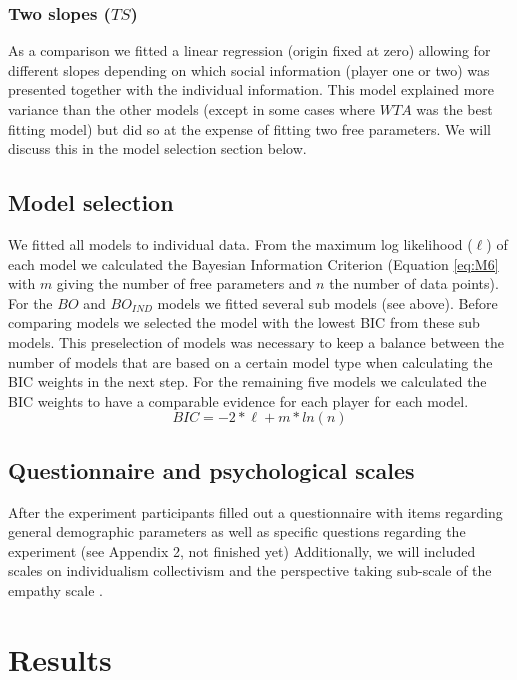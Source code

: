 \documentclass[jou]{apa}
\begin{document}
\subsubsection{Two slopes ($TS$)}
As a comparison we fitted a linear regression (origin fixed at zero) allowing for different slopes depending on which social information (player one or two) was presented together with the individual information. This model explained more variance than the other models (except in some cases where $WTA$ was the best fitting model) but did so at the expense of fitting two free parameters. We will discuss this in the model selection section below.
\subsection{Model selection}
We fitted all models to individual data. From the maximum log likelihood ($\ell$) of each model we calculated the Bayesian Information Criterion (Equation \ref{eq:M6} with  $m$ giving the number of free parameters and $n$ the number of data points). For the $BO$ and $BO_{IND}$ models we fitted several sub models (see above). Before comparing models we selected the model with the lowest BIC from these sub models. This preselection of models was necessary to keep a balance between the number of models that are based on a certain model type when calculating the BIC weights in the next step. For the remaining five models we calculated the BIC weights to have a comparable evidence for each player for each model\cite{bolker_ecological_2008}.
\begin{equation}
BIC=-2*\ell+m*ln(n)
\label{eq:M6}
\end{equation} 

\subsection{Questionnaire and psychological scales}
After the experiment participants filled out a questionnaire with items regarding general demographic parameters as well as specific questions regarding the experiment (see Appendix 2, not finished yet) Additionally, we will included scales on individualism collectivism \cite{oyserman_rethinking_2002} and the perspective taking sub-scale of the empathy scale \cite{davis_multidimensional_1980}.

\section{Results}
\end{document}

